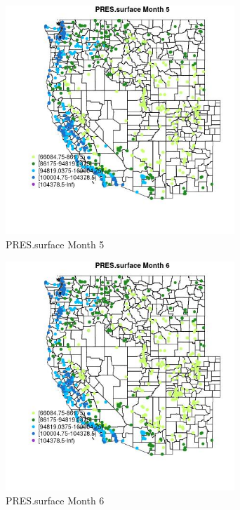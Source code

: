 \begin{figure} 
\centering  
\includegraphics[width=0.77\textwidth]{Code_Outputs/Report_ML_input_PM25_Step4_part_e_de_duplicated_aves_compiled_2019-05-21wNAs_MapObsMo5PRESsurface.jpg} 
\caption{\label{fig:Report_ML_input_PM25_Step4_part_e_de_duplicated_aves_compiled_2019-05-21wNAsMapObsMo5PRESsurface}PRES.surface Month 5} 
\end{figure} 
 

\begin{figure} 
\centering  
\includegraphics[width=0.77\textwidth]{Code_Outputs/Report_ML_input_PM25_Step4_part_e_de_duplicated_aves_compiled_2019-05-21wNAs_MapObsMo6PRESsurface.jpg} 
\caption{\label{fig:Report_ML_input_PM25_Step4_part_e_de_duplicated_aves_compiled_2019-05-21wNAsMapObsMo6PRESsurface}PRES.surface Month 6} 
\end{figure} 
 

